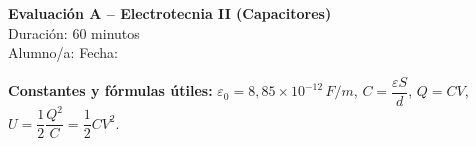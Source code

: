 \documentclass[a4paper,12pt]{article}
\begin{document}
\begin{center}
    \Large \textbf{Evaluación A – Electrotecnia II (Capacitores)} \\
    \normalsize Duración: 60 minutos \\
    Alumno/a: \underline{\hspace{6cm}} \hspace{0.5cm} Fecha: \underline{\hspace{2cm}}
\end{center}

\vspace{0.3cm}

\noindent\textbf{Constantes y fórmulas útiles:} \(\varepsilon_0 = 8{,}85\times 10^{-12}\,\si{F/m}\), \quad
\(C=\dfrac{\varepsilon S}{d}\), \quad \(Q=CV\), \quad \(U=\dfrac{1}{2}\dfrac{Q^2}{C}=\dfrac{1}{2}CV^2\).

\vspace{0.2cm}
\end{document}
